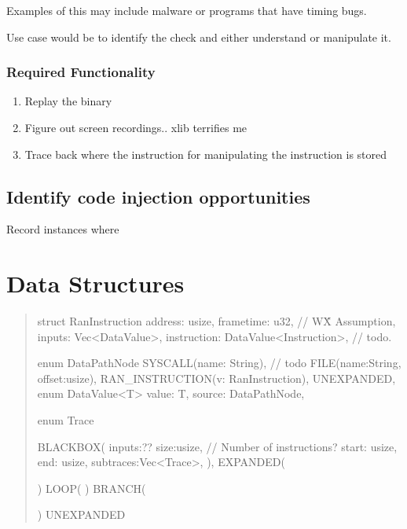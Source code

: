 Examples of this may include malware or programs that have timing bugs. 

Use case would be to identify the check and either understand or manipulate it. 


\subsubsection{Required Functionality}
\begin{enumerate}
    \item Replay the binary 
    \item Figure out screen recordings.. xlib terrifies me
    \item Trace back where the instruction for manipulating the instruction is stored

\end{enumerate}


\subsection{Identify code injection opportunities}
Record instances where 


\section{Data Structures}
\begin{quotation}
    struct RanInstruction{
        address: usize,
        frametime: u32, // W\^X Assumption,
        inputs: Vec<DataValue>,
        instruction: DataValue<Instruction>, // todo. 
    }

    enum DataPathNode{
        SYSCALL(name: String), // todo
        FILE(name:String, offset:usize),
        RAN\_INSTRUCTION(v: RanInstruction),
        UNEXPANDED,
    }
    enum DataValue<T> {
        value: T, 
        source: DataPathNode,
    }

    enum Trace{
        BLACKBOX(
            inputs:??
            size:usize, // Number of instructions?
            start: usize,
            end: usize,
            subtraces:Vec<Trace>,
        ),
        EXPANDED(

        )
        LOOP(
        )
        BRANCH(

        )
        UNEXPANDED


    }

\end{quotation}




